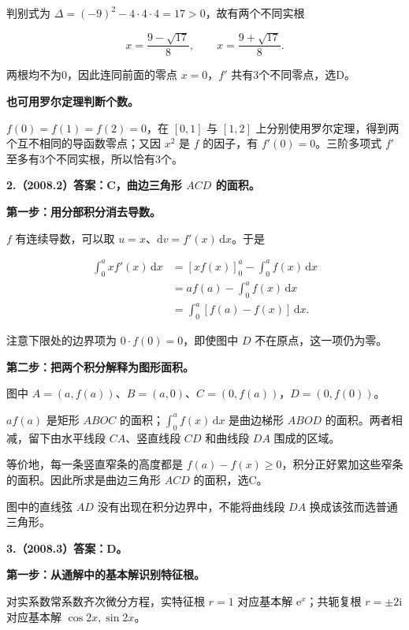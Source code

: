 \documentclass[UTF8,11pt,fontset=windows]{ctexart}
\begin{document}
判别式为 $\Delta=(-9)^2-4\cdot4\cdot4=17>0$，故有两个不同实根

$$
x=\frac{9-\sqrt{17}}8,\qquad x=\frac{9+\sqrt{17}}8.
$$

两根均不为0，因此连同前面的零点 $x=0$，$f'$ 共有3个不同零点，选D。

\textbf{也可用罗尔定理判断个数。}

$f(0)=f(1)=f(2)=0$，在 $[0,1]$ 与 $[1,2]$ 上分别使用罗尔定理，得到两个互不相同的导函数零点；又因 $x^2$ 是 $f$ 的因子，有 $f'(0)=0$。三阶多项式 $f'$ 至多有3个不同实根，所以恰有3个。

\clearpage

\textbf{2.（2008.2）答案：C，曲边三角形 $ACD$ 的面积。}

\textbf{第一步：用分部积分消去导数。}

$f$ 有连续导数，可以取 $u=x$、$\mathrm dv=f'(x)\,\mathrm dx$。于是

$$
\begin{aligned}
\int_0^a x f'(x)\,\mathrm dx
&=[xf(x)]_0^a-\int_0^a f(x)\,\mathrm dx\\
&=af(a)-\int_0^a f(x)\,\mathrm dx\\
&=\int_0^a[f(a)-f(x)]\,\mathrm dx.
\end{aligned}
$$

注意下限处的边界项为 $0\cdot f(0)=0$，即使图中 $D$ 不在原点，这一项仍为零。

\textbf{第二步：把两个积分解释为图形面积。}

图中 $A=(a,f(a))$、$B=(a,0)$、$C=(0,f(a))$，$D=(0,f(0))$。

$af(a)$ 是矩形 $ABOC$ 的面积；$\int_0^a f(x)\,\mathrm dx$ 是曲边梯形 $ABOD$ 的面积。两者相减，留下由水平线段 $CA$、竖直线段 $CD$ 和曲线段 $DA$ 围成的区域。

等价地，每一条竖直窄条的高度都是 $f(a)-f(x)\ge0$，积分正好累加这些窄条的面积。因此所求是曲边三角形 $ACD$ 的面积，选C。

图中的直线弦 $AD$ 没有出现在积分边界中，不能将曲线段 $DA$ 换成该弦而选普通三角形。

\clearpage

\textbf{3.（2008.3）答案：D。}

\textbf{第一步：从通解中的基本解识别特征根。}

对实系数常系数齐次微分方程，实特征根 $r=1$ 对应基本解 $\mathrm e^x$；共轭复根 $r=\pm2\mathrm i$ 对应基本解 $\cos2x,\sin2x$。
\end{document}

